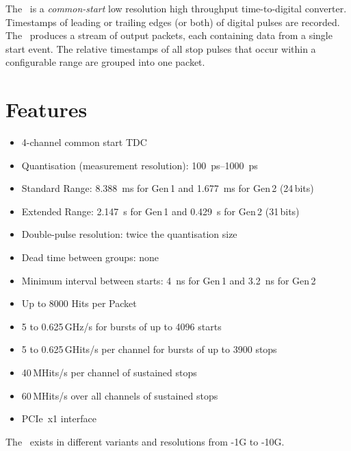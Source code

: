 The \deviceName\ is a \emph{common-start} low resolution high throughput
time-to-digital converter.  Timestamps of leading or trailing edges (or both)
of digital pulses are recorded.  The \deviceName\ produces a stream of output
packets, each containing data from a single start event.  The relative
timestamps of all stop pulses that occur within a configurable range are
grouped into one packet.

\section{Features} \label{sec:features}
\begin{itemize}
    \item 4-channel common start TDC
    \item Quantisation (measurement resolution):
        \SIrange{100}{1000}{\pico\second}
    \item Standard Range: \SI{8.388}{\milli\second} for Gen\,1 and
        \SI{1.677}{\milli\second} for Gen\,2 (24\,bits)
    \item Extended Range: \SI{2.147}{\second} for Gen\,1 and
        \SI{0.429}{\second} for Gen\,2 (31\,bits)
    \item Double-pulse resolution: twice the quantisation size
    \item Dead time between groups: none
    \item Minimum interval between starts: \SI{4}{\nano\second} for Gen\,1
        and \SI{3.2}{\nano\second} for Gen\,2
    \item Up to 8000 Hits per Packet
    \item 5 to 0.625\,GHz/s for bursts of up to 4096 starts
    \item 5 to 0.625\,GHits/s per channel for bursts of up to 3900 stops
    \item 40\,MHits/s per channel of sustained stops
    \item 60\,MHits/s over all channels of sustained stops
    \item PCIe~x1 interface
\end{itemize} 

The \deviceName\ exists in different variants and resolutions from
\deviceName-1G to \deviceName-10G.  

